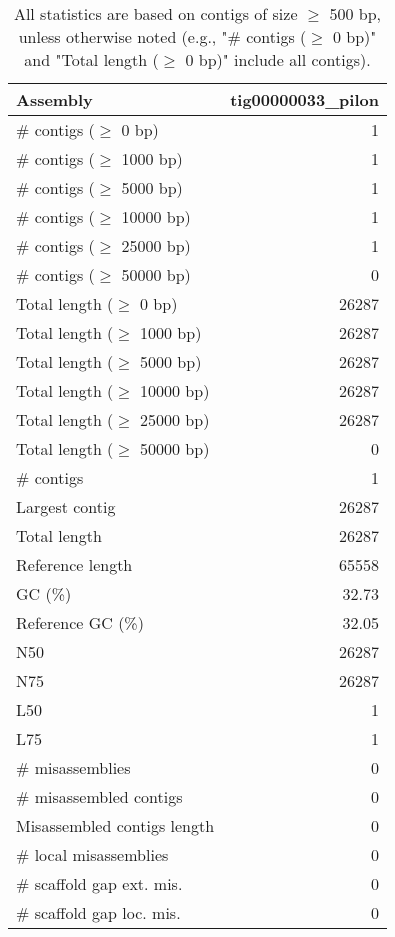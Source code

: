 \documentclass[12pt,a4paper]{article}
\begin{document}
\begin{table}[ht]
\begin{center}
\caption{All statistics are based on contigs of size $\geq$ 500 bp, unless otherwise noted (e.g., "\# contigs ($\geq$ 0 bp)" and "Total length ($\geq$ 0 bp)" include all contigs).}
\begin{tabular}{|l*{1}{|r}|}
\hline
Assembly & tig00000033\_pilon \\ \hline
\# contigs ($\geq$ 0 bp) & 1 \\ \hline
\# contigs ($\geq$ 1000 bp) & 1 \\ \hline
\# contigs ($\geq$ 5000 bp) & 1 \\ \hline
\# contigs ($\geq$ 10000 bp) & 1 \\ \hline
\# contigs ($\geq$ 25000 bp) & 1 \\ \hline
\# contigs ($\geq$ 50000 bp) & 0 \\ \hline
Total length ($\geq$ 0 bp) & 26287 \\ \hline
Total length ($\geq$ 1000 bp) & 26287 \\ \hline
Total length ($\geq$ 5000 bp) & 26287 \\ \hline
Total length ($\geq$ 10000 bp) & 26287 \\ \hline
Total length ($\geq$ 25000 bp) & 26287 \\ \hline
Total length ($\geq$ 50000 bp) & 0 \\ \hline
\# contigs & 1 \\ \hline
Largest contig & 26287 \\ \hline
Total length & 26287 \\ \hline
Reference length & 65558 \\ \hline
GC (\%) & 32.73 \\ \hline
Reference GC (\%) & 32.05 \\ \hline
N50 & 26287 \\ \hline
N75 & 26287 \\ \hline
L50 & 1 \\ \hline
L75 & 1 \\ \hline
\# misassemblies & 0 \\ \hline
\# misassembled contigs & 0 \\ \hline
Misassembled contigs length & 0 \\ \hline
\# local misassemblies & 0 \\ \hline
\# scaffold gap ext. mis. & 0 \\ \hline
\# scaffold gap loc. mis. & 0 \\ \hline

\end{tabular}
\end{center}
\end{table}
\end{document}
